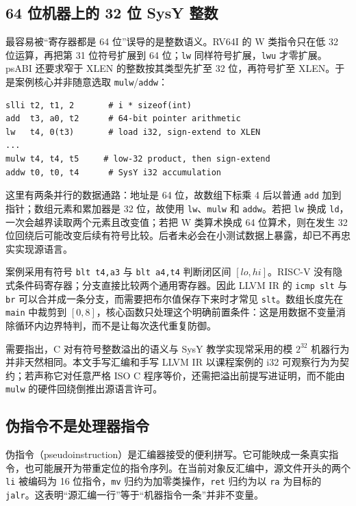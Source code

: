 \subsection{64 位机器上的 32 位 SysY 整数}

最容易被“寄存器都是 64 位”误导的是整数语义。RV64I 的 W 类指令只在低 32 位运算，再把第 31 位符号扩展到 64 位；\texttt{lw} 同样符号扩展，\texttt{lwu} 才零扩展\cite{bin-riscv-unpriv}。psABI 还要求窄于 XLEN 的整数按其类型先扩至 32 位，再符号扩至 XLEN。于是案例核心并非随意选取 \texttt{mulw}/\texttt{addw}：

\begin{verbatim}
slli t2, t1, 2       # i * sizeof(int)
add  t3, a0, t2      # 64-bit pointer arithmetic
lw   t4, 0(t3)       # load i32, sign-extend to XLEN
...
mulw t4, t4, t5     # low-32 product, then sign-extend
addw t0, t0, t4      # SysY i32 accumulation
\end{verbatim}

这里有两条并行的数据通路：地址是 64 位，故数组下标乘 4 后以普通 \texttt{add} 加到指针；数组元素和累加器是 32 位，故使用 \texttt{lw}、\texttt{mulw} 和 \texttt{addw}。若把 \texttt{lw} 换成 \texttt{ld}，一次会越界读取两个元素且改变值；若把 W 类算术换成 64 位算术，则在发生 32 位回绕后可能改变后续有符号比较。后者未必会在小测试数据上暴露，却已不再忠实实现源语言。

案例采用有符号 \texttt{blt t4,a3} 与 \texttt{blt a4,t4} 判断闭区间 \([lo,hi]\)。RISC-V 没有隐式条件码寄存器；分支直接比较两个通用寄存器。因此 LLVM IR 的 \texttt{icmp slt} 与 \texttt{br} 可以合并成一条分支，而需要把布尔值保存下来时才常见 \texttt{slt}。数组长度先在 \texttt{main} 中裁剪到 \([0,8]\)，核心函数只处理这个明确前置条件：这是用数据不变量消除循环内边界特判，而不是让每次迭代重复防御。

需要指出，C 对有符号整数溢出的语义与 SysY 教学实现常采用的模 \(2^{32}\) 机器行为并非天然相同。本文手写汇编和手写 LLVM IR 以课程案例的 i32 可观察行为为契约；若声称它对任意严格 ISO C 程序等价，还需把溢出前提写进证明，而不能由 \texttt{mulw} 的硬件回绕倒推出源语言许可。

\subsection{伪指令不是处理器指令}

伪指令（pseudoinstruction）是汇编器接受的便利拼写。它可能映成一条真实指令，也可能展开为带重定位的指令序列\cite{bin-riscv-asm}。在当前对象反汇编中，源文件开头的两个 \texttt{li} 被编码为 16 位指令，\texttt{mv} 归约为加零类操作，\texttt{ret} 归约为以 \texttt{ra} 为目标的 \texttt{jalr}。这表明“源汇编一行”等于“机器指令一条”并非不变量。

